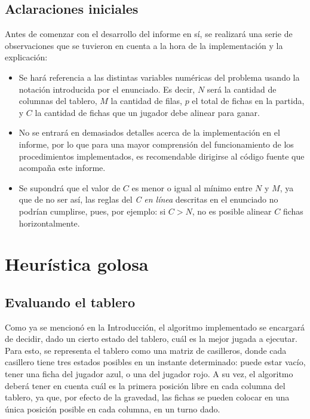 \documentclass[12pt,a4paper]{article}
\begin{document}
    \subsection{Aclaraciones iniciales}
    Antes de comenzar con el desarrollo del informe en sí, se realizará una serie de observaciones que se tuvieron en cuenta a la hora de la implementación y la explicación:
        \begin{itemize}
            \item Se hará referencia a las distintas variables numéricas del problema usando la notación introducida por el enunciado. Es decir, $N$ será la cantidad de columnas del tablero, $M$ la cantidad de filas, $p$ el total de fichas en la partida, y $C$ la cantidad de fichas que un jugador debe alinear para ganar.
            \item No se entrará en demasiados detalles acerca de la implementación en el informe, por lo que para una mayor comprensión del funcionamiento de los procedimientos implementados, es recomendable dirigirse al código fuente que acompaña este informe.
            \item Se supondrá que el valor de $C$ es menor o igual al mínimo entre $N$ y $M$, ya que de no ser así, las reglas del \textit{C en línea} descritas en el enunciado no podrían cumplirse, pues, por ejemplo: si $C > N$, no es posible alinear $C$ fichas horizontalmente.
        \end{itemize}
    

\newpage




\section{Heurística golosa}


	
	\subsection{Evaluando el tablero}
		
    Como ya se mencionó en la Introducción, el algoritmo implementado se encargará de decidir, dado un cierto estado del tablero, cuál es la mejor jugada a ejecutar. Para esto, se representa el tablero como una matriz de casilleros, donde cada casillero tiene tres estados posibles en un instante determinado: puede estar vacío, tener una ficha del jugador azul, o una del jugador rojo. A su vez, el algoritmo deberá tener en cuenta cuál es la primera posición libre en cada columna del tablero, ya que, por efecto de la gravedad, las fichas se pueden colocar en una única posición posible en cada columna, en un turno dado.
    
\end{document}
